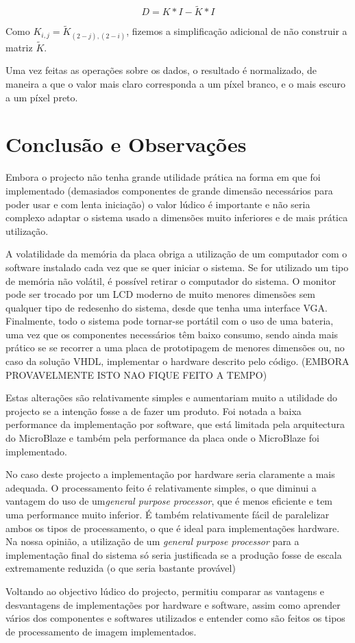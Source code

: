 \documentclass[a4paper]{article}
\begin{document}
\[
D = K \ast I - \widetilde{K} \ast I
\]

Como $K_{i,j} = \widetilde{K}_{(2-j),(2-i)}$, fizemos a simplificação adicional de não construir a matriz $\widetilde{K}$.

Uma vez feitas as operações sobre os dados, o resultado é normalizado, de maneira a que o valor mais claro corresponda a um píxel branco, e o mais escuro a um píxel preto.





\section{Conclusão e Observações}
Embora o projecto não tenha grande utilidade prática na forma em que foi implementado (demasiados componentes de grande dimensão necessários para poder usar e com lenta iniciação) o valor lúdico é importante e não seria complexo adaptar o sistema usado a dimensões muito inferiores e de mais prática utilização. 

A volatilidade da memória da placa obriga a utilização de um computador com o software instalado cada vez que se quer iniciar o sistema. Se for utilizado um tipo de memória não volátil, é possível retirar o computador do sistema. O monitor pode ser trocado por um LCD moderno de muito menores dimensões sem qualquer tipo de redesenho do sistema, desde que tenha uma interface VGA. Finalmente, todo o sistema pode tornar-se portátil com o uso de uma bateria, uma vez que os componentes necessários têm baixo consumo, sendo ainda mais prático se se recorrer a uma placa de prototipagem de menores dimensões ou, no caso da solução VHDL, implementar o hardware descrito pelo código. (EMBORA PROVAVELMENTE ISTO NAO FIQUE FEITO A TEMPO)

Estas alterações são relativamente simples e aumentariam muito a utilidade do projecto se a intenção fosse a de fazer um produto. 
Foi notada a baixa performance da implementação por software, que está limitada pela arquitectura do MicroBlaze e também pela performance da placa onde o MicroBlaze foi implementado. 

No caso deste projecto a implementação por hardware seria claramente a mais adequada. O processamento feito é relativamente simples, o que diminui a vantagem do uso de um\textit{general purpose processor}, que é menos eficiente e tem uma performance muito inferior. É também relativamente fácil de paralelizar ambos os tipos de processamento, o que é ideal para implementações hardware. Na nossa opinião, a utilização de um \textit{general purpose processor} para a implementação final do sistema só seria justificada se a produção fosse de escala extremamente reduzida (o que seria bastante provável)

Voltando ao objectivo lúdico do projecto, permitiu comparar as vantagens e desvantagens de implementações por hardware e software, assim como aprender vários dos componentes e softwares utilizados e entender como são feitos os tipos de processamento de imagem implementados.






\nocite{}
\end{document}
